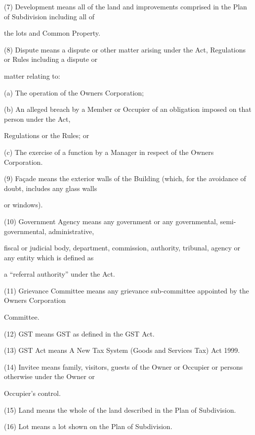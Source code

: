 \documentclass{article}
\begin{document}
{\fontsize{9.962}{1}(7) Development means all of the land and improvements comprised in the Plan of Subdivision including all of }

{\fontsize{10.02}{1}the lots and Common Property. }

{\fontsize{9.962}{1}(8) Dispute means a dispute or other matter arising under the Act, Regulations or Rules including a dispute or }

{\fontsize{10.02}{1}matter relating to: }

{\fontsize{9.962}{1}(a) The operation of the Owners Corporation; }

{\fontsize{9.962}{1}(b) An alleged breach by a Member or Occupier of an obligation imposed on that person under the Act, }

{\fontsize{10.02}{1}Regulations or the Rules; or }

{\fontsize{9.962}{1}(c) The exercise of a function by a Manager in respect of the Owners Corporation. }

{\fontsize{9.962}{1}(9) Façade means the exterior walls of the Building (which, for the avoidance of doubt, includes any glass walls }

{\fontsize{10.02}{1}or windows). }

{\fontsize{9.962}{1}(10) Government Agency means any government or any governmental, semi-governmental, administrative, }

{\fontsize{10.02}{1}fiscal or judicial body, department, commission, authority, tribunal, agency or any entity which is defined as }

{\fontsize{10.02}{1}a “referral authority” under the Act. }

{\fontsize{9.962}{1}(11) Grievance Committee means any grievance sub-committee appointed by the Owners Corporation }

{\fontsize{10.02}{1}Committee. }

{\fontsize{9.962}{1}(12) GST means GST as defined in the GST Act. }

{\fontsize{9.962}{1}(13) GST Act means A New Tax System (Goods and Services Tax) Act 1999. }

{\fontsize{9.962}{1}(14) Invitee means family, visitors, guests of the Owner or Occupier or persons otherwise under the Owner or }

{\fontsize{10.02}{1}Occupier’s control. }

{\fontsize{9.962}{1}(15) Land means the whole of the land described in the Plan of Subdivision. }

{\fontsize{9.962}{1}(16) Lot means a lot shown on the Plan of Subdivision. }
\end{document}
